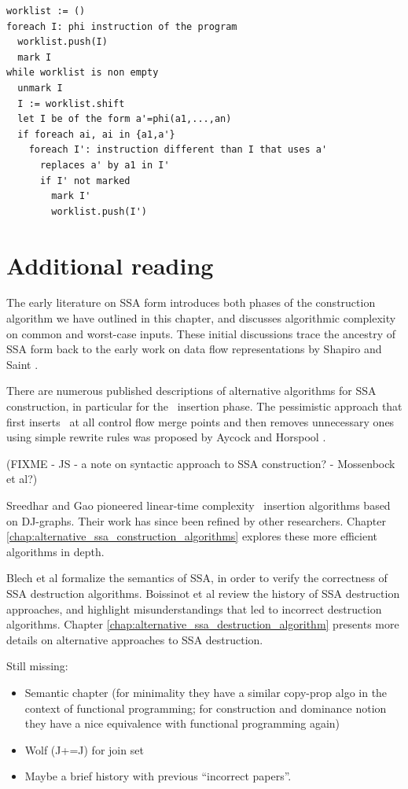 \begin{verbatim}
worklist := ()
foreach I: phi instruction of the program
  worklist.push(I)
  mark I
while worklist is non empty
  unmark I
  I := worklist.shift
  let I be of the form a'=phi(a1,...,an)
  if foreach ai, ai in {a1,a'}
    foreach I': instruction different than I that uses a'
      replaces a' by a1 in I'
      if I' not marked
        mark I'
        worklist.push(I')
\end{verbatim}


\section{Additional reading}

The early literature on SSA form
\cite{cytron89efficient,cytron91efficiently}
introduces both phases of the construction algorithm
we have outlined in this chapter,
and discusses algorithmic complexity on common and worst-case inputs.
These initial discussions trace the ancestry of SSA form back to the
early work on data flow representations by Shapiro and Saint
\cite{shapiro69representation}.

There are numerous published descriptions of alternative algorithms
for SSA construction, in particular for the \phiop\ insertion phase.
The pessimistic approach that first inserts \phiops\ at all control flow merge points and then removes unnecessary ones using simple rewrite rules was proposed by Aycock
and Horspool \cite{aycock00simple}. 

(FIXME - JS - a note on syntactic approach to SSA construction?
- Mossenbock et al?)

Sreedhar and Gao \cite{sreedhar95linear} pioneered
linear-time complexity 
\phiop\ insertion
algorithms based on DJ-graphs.
Their work has since been refined by other researchers.
Chapter \ref{chap:alternative_ssa_construction_algorithms}
explores these more efficient algorithms in depth.

Blech et al \cite{blech05optimizing}
formalize the semantics of SSA, in order to verify
the correctness of SSA destruction algorithms.
Boissinot et al \cite{boissinot09revisiting} review the history of SSA destruction approaches,
and highlight misunderstandings that led to incorrect destruction
algorithms.
Chapter \ref{chap:alternative_ssa_destruction_algorithm} presents
more details on alternative approaches to SSA destruction.

Still missing:
\begin{itemize}
\item Semantic chapter (for minimality they have a similar copy-prop algo in the context of functional programming; for construction and dominance notion they have a nice equivalence with functional programming again) 
\item Wolf (J+=J) for join set
\item Maybe a brief history with previous ``incorrect papers''.
\end{itemize}
